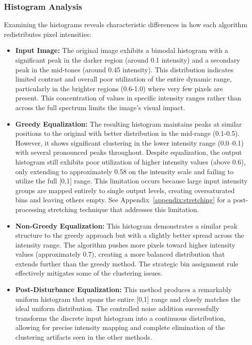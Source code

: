 \documentclass[12pt,a4paper]{article}
\begin{document}
\subsubsection{Histogram Analysis}\label{HistogramAnalysis}

Examining the histograms reveals characteristic differences in how each algorithm redistributes pixel intensities:

\begin{itemize}
    \item \textbf{Input Image:} The original image exhibits a bimodal histogram with a significant peak in the darker region (around 0.1 intensity) and a secondary peak in the mid-tones (around 0.45 intensity). This distribution indicates limited contrast and overall poor utilization of the entire dynamic range, particularly in the brighter regions (0.6-1.0) where very few pixels are present. This concentration of values in specific intensity ranges rather than across the full spectrum limits the image's visual impact.

    \item \textbf{Greedy Equalization:} The resulting histogram maintains peaks at similar positions to the original with better distribution in the mid-range (0.1-0.5). However, it shows significant clustering in the lower intensity range (0.0--0.1) with several pronounced peaks throughout. Despite equalization, the output histogram still exhibits poor utilization of higher intensity values (above 0.6), only extending to approximately 0.58 on the intensity scale and failing to utilize the full [0,1] range. This limitation occurs because large input intensity groups are mapped entirely to single output levels, creating oversaturated bins and leaving others empty. See Appendix~\ref{appendix:stretching} for a post-processing stretching technique that addresses this limitation.


    \item \textbf{Non-Greedy Equalization:} This histogram demonstrates a similar peak structure to the greedy approach but with a slightly better spread across the intensity range. The algorithm pushes more pixels toward higher intensity values (approximately 0.7), creating a more balanced distribution that extends further than the greedy method. The strategic bin assignment rule effectively mitigates some of the clustering issues.    

    \item \textbf{Post-Disturbance Equalization:} This method produces a remarkably uniform histogram that spans the entire [0,1] range and closely matches the ideal uniform distribution. The controlled noise addition successfully transforms the discrete input histogram into a continuous distribution, allowing for precise intensity mapping and complete elimination of the clustering artifacts seen in the other methods.
\end{itemize}
\end{document}
